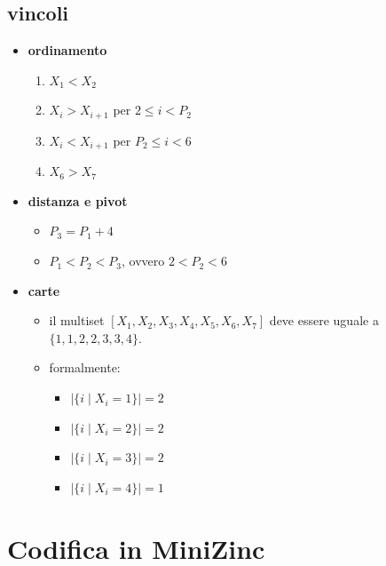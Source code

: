 \documentclass[12pt]{article}
\begin{document}
\subsection*{vincoli}
\begin{itemize}
\item \textbf{ordinamento}
    \begin{enumerate}
        \item $X_1 < X_{2}$         
        \item $X_i > X_{i+1}$ per $2 \leq i < P_2$
        \item $X_i < X_{i+1}$ per $P_2 \leq i < 6$
        \item $X_6 > X_{7}$
    \end{enumerate}

    \item \textbf{distanza e pivot}
    \begin{itemize}
        \item $P_3 = P_1 + 4$
        \item $P_1 < P_2 < P_3$, ovvero $2 < P_2 < 6$
    \end{itemize}

    \item \textbf{carte}
        \begin{itemize}
            \item il multiset $[X_1, X_2, X_3, X_4, X_5, X_6, X_7]$ deve essere uguale a $\{1, 1, 2, 2, 3, 3, 4\}$.
        \item formalmente:
        \begin{itemize}
            \item $|\{i \mid X_i = 1\}| = 2$
            \item $|\{i \mid X_i = 2\}| = 2$
            \item $|\{i \mid X_i = 3\}| = 2$
            \item $|\{i \mid X_i = 4\}| = 1$
        \end{itemize}
    \end{itemize}
\end{itemize}

\section{Codifica in MiniZinc}
\end{document}
